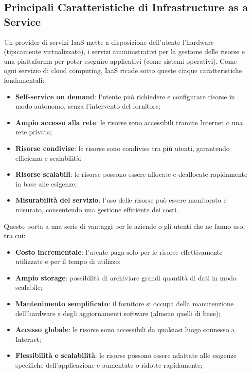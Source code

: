 \documentclass[12pt,a4paper,openright,twoside]{book}
\begin{document}
\subsection{Principali Caratteristiche di Infrastructure as a Service}
Un provider di servizi \ac{IaaS} mette a disposizione dell'utente l'hardware (tipicamente virtualizzato), i servizi amministrativi per la gestione delle risorse e una piattaforma per poter eseguire applicativi (come sistemi operativi).
Come ogni servizio di cloud computing, \ac{IaaS} ricade sotto queste cinque caratteristiche fondamentali\cite{bhardwaj2010cloud}:
\begin{itemize}
    \item \textbf{Self-service on demand}: l'utente può richiedere e configurare risorse in modo autonomo, senza l'intervento del fornitore;
    \item \textbf{Ampio accesso alla rete}: le risorse sono accessibili tramite Internet o una rete privata;
    \item \textbf{Risorse condivise}: le risorse sono condivise tra più utenti, garantendo efficienza e scalabilità;
    \item \textbf{Risorse scalabili}: le risorse possono essere allocate e deallocate rapidamente in base alle esigenze;
    \item \textbf{Misurabilità del servizio}: l'uso delle risorse può essere monitorato e misurato, consentendo una gestione efficiente dei costi.
\end{itemize}
Questo porta a una serie di vantaggi per le aziende o gli utenti che ne fanno uso, tra cui\cite{bhardwaj2010cloud}:
\begin{itemize}
    \item \textbf{Costo incrementale}: l'utente paga solo per le risorse effettivamente utilizzate e per il tempo di utilizzo;
    \item \textbf{Ampio storage}: possibilità di archiviare grandi quantità di dati in modo scalabile;
    \item \textbf{Mantenimento semplificato}: il fornitore si occupa della manutenzione dell'hardware e degli aggiornamenti software (almeno quelli di base);
    \item \textbf{Accesso globale}: le risorse sono accessibili da qualsiasi luogo connesso a Internet;
    \item \textbf{Flessibilità e scalabilità}: le risorse possono essere adattate alle esigenze specifiche dell'applicazione e aumentate o ridotte rapidamente;
\end{itemize}
\end{document}
